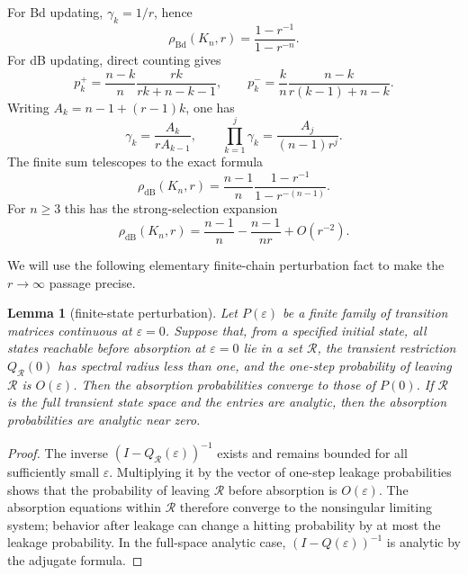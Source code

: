 \documentclass[11pt]{article}
\newtheorem{lemma}[theorem]{Lemma}
\newcommand{\Bd}{\mathrm{Bd}}
\newcommand{\dB}{\mathrm{dB}}
\begin{document}
For Bd updating, $\gamma_k=1/r$, hence
\begin{equation}\label{eq:Bd-baseline}
 \rho_{\Bd}(K_n,r)=\frac{1-r^{-1}}{1-r^{-n}}.
\end{equation}
For dB updating, direct counting gives
\[
 p_k^+=\frac{n-k}{n}\frac{rk}{rk+n-k-1},\qquad
 p_k^-=\frac{k}{n}\frac{n-k}{r(k-1)+n-k}.
\]
Writing $A_k=n-1+(r-1)k$, one has
\[
 \gamma_k=\frac{A_k}{rA_{k-1}},\qquad
 \prod_{k=1}^j\gamma_k=\frac{A_j}{(n-1)r^j}.
\]
The finite sum telescopes to the exact formula
\begin{equation}\label{eq:dB-baseline}
 \rho_{\dB}(K_n,r)
 =\frac{n-1}{n}\frac{1-r^{-1}}{1-r^{-(n-1)}}.
\end{equation}
For $n\ge3$ this has the strong-selection expansion
\begin{equation}\label{eq:dB-baseline-expansion}
 \rho_{\dB}(K_n,r)
 =\frac{n-1}{n}-\frac{n-1}{nr}+O(r^{-2}).
\end{equation}

We will use the following elementary finite-chain perturbation fact to make
the $r\to\infty$ passage precise.

\begin{lemma}[finite-state perturbation]\label{lem:perturbation}
Let $P(\varepsilon)$ be a finite family of transition matrices continuous at
$\varepsilon=0$.  Suppose that, from a specified initial state, all states
reachable before absorption at $\varepsilon=0$ lie in a set $\mathcal R$, the
transient restriction $Q_{\mathcal R}(0)$ has spectral radius less than one,
and the one-step probability of leaving $\mathcal R$ is $O(\varepsilon)$.
Then the absorption probabilities converge to those of $P(0)$.  If
$\mathcal R$ is the full transient state space and the entries are analytic,
then the absorption probabilities are analytic near zero.
\end{lemma}

\begin{proof}
The inverse $(I-Q_{\mathcal R}(\varepsilon))^{-1}$ exists and remains bounded
for all sufficiently small $\varepsilon$.  Multiplying it by the vector of
one-step leakage probabilities shows that the probability of leaving
$\mathcal R$ before absorption is $O(\varepsilon)$.  The absorption equations
within $\mathcal R$ therefore converge to the nonsingular limiting system;
behavior after leakage can change a hitting probability by at most the
leakage probability.  In the full-space analytic case,
$(I-Q(\varepsilon))^{-1}$ is analytic by the adjugate formula.
\end{proof}
\end{document}
